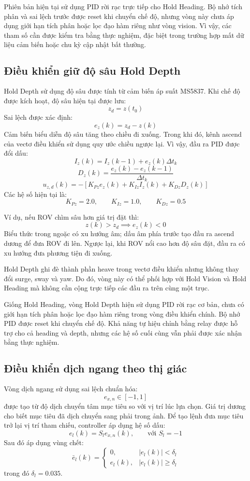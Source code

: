 \documentclass[../DoAn.tex]{subfiles}
\begin{document}
Phiên bản hiện tại sử dụng PID rời rạc trực tiếp cho Hold Heading. Bộ nhớ tích phân và sai lệch trước được reset khi chuyển chế độ, nhưng vòng này chưa áp dụng giới hạn tích phân hoặc lọc đạo hàm riêng như vòng vision. Vì vậy, các tham số cần được kiểm tra bằng thực nghiệm, đặc biệt trong trường hợp mất dữ liệu cảm biến hoặc chu kỳ cập nhật bất thường.

\subsection{Điều khiển giữ độ sâu Hold Depth}

Hold Depth sử dụng độ sâu được tính từ cảm biến áp suất MS5837. Khi chế độ được kích hoạt, độ sâu hiện tại được lưu:
\[
z_d = z(t_0)
\]
Sai lệch được xác định:
\[
e_z(k) = z_d - z(k)
\]
Cảm biến biểu diễn độ sâu tăng theo chiều đi xuống. Trong khi đó, kênh ascend của vectơ điều khiển sử dụng quy ước chiều ngược lại. Vì vậy, đầu ra PID được đổi dấu:
\[
I_z(k) = I_z(k-1) + e_z(k)\Delta t_k
\]
\[
D_z(k) = \frac{e_z(k)-e_z(k-1)}{\Delta t_k}
\]
\[
u_{z,d}(k) = -\left[ K_{Pz}e_z(k) + K_{Iz}I_z(k) + K_{Dz}D_z(k) \right]
\]
Các hệ số hiện tại là:
\[
K_{Pz} = 2.0, \qquad K_{Iz} = 1.0, \qquad K_{Dz} = 0.5
\]

Ví dụ, nếu ROV chìm sâu hơn giá trị đặt thì:
\[
z(k) > z_d \implies e_z(k) < 0
\]
Biểu thức trong ngoặc có xu hướng âm; dấu âm phía trước tạo đầu ra ascend dương để đưa ROV đi lên. Ngược lại, khi ROV nổi cao hơn độ sâu đặt, đầu ra có xu hướng đưa phương tiện đi xuống.

Hold Depth ghi đè thành phần heave trong vectơ điều khiển nhưng không thay đổi surge, sway và yaw. Do đó, vòng này có thể phối hợp với Hold Vision và Hold Heading mà không cần cộng trực tiếp các đầu ra trên cùng một trục.

Giống Hold Heading, vòng Hold Depth hiện sử dụng PID rời rạc cơ bản, chưa có giới hạn tích phân hoặc lọc đạo hàm riêng trong vòng điều khiển chính. Bộ nhớ PID được reset khi chuyển chế độ. Khả năng tự hiệu chỉnh bằng relay được hỗ trợ cho cả heading và depth, nhưng các hệ số cuối cùng vẫn phải được xác nhận bằng thực nghiệm.

\subsection{Điều khiển dịch ngang theo thị giác}

Vòng dịch ngang sử dụng sai lệch chuẩn hóa:
\[
e_{x,n} \in [-1, 1]
\]
được tạo từ độ dịch chuyển tâm mục tiêu so với vị trí lúc lựa chọn. Giá trị dương cho biết mục tiêu đã dịch chuyển sang phải trong ảnh. Để tạo lệnh đưa mục tiêu trở lại vị trí tham chiếu, controller áp dụng hệ số dấu:
\[
e_l(k) = S_l e_{x,n}(k), \qquad \text{với } S_l = -1
\]
Sau đó áp dụng vùng chết:
\[
\bar{e}_l(k) = 
\begin{cases}
0, & |e_l(k)| < \delta_l \\
e_l(k), & |e_l(k)| \geq \delta_l
\end{cases}
\]
trong đó $\delta_l = 0.035$.
\end{document}
